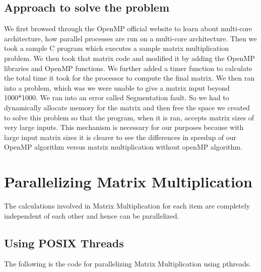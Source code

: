 \documentclass{article}
\begin{document}
\subsection{Approach to solve the problem}
We first browsed through the OpenMP official website to learn
about multi-core architecture, how parallel processes are run on a multi-core
architecture. Then we took a sample C program which executes a sample matrix
multiplication problem. We then took that matrix code and modified it by adding the
OpenMP libraries and OpenMP functions. We further added a timer function to
calculate the total time it took for the processor to compute the final matrix. We then
ran into a problem, which was we were unable to give a matrix input beyond
1000*1000. We ran into an error called Segmentation fault. So we had to dynamically
allocate memory for the matrix and then free the space we created to solve this
problem so that the program, when it is ran, accepts matrix sizes of very large inputs.
This mechanism is necessary for our purposes because with large input matrix sizes it is
clearer to see the differences in speedup of our OpenMP algorithm versus matrix
multiplication without openMP algorithm.


\section{Parallelizing Matrix Multiplication}
The calculations involved in Matrix Multiplication for each item are completely independent of 
each other and hence can be parallelized.

\subsection{Using POSIX Threads}

The following is the code for parallelizing Matrix Multiplication using pthreads.
\end{document}
